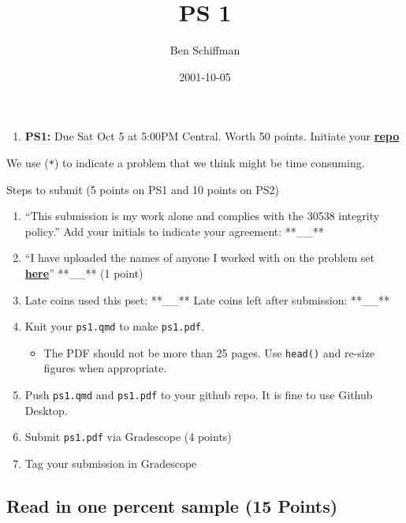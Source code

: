 \documentclass[
  letterpaper,
  DIV=11,
  numbers=noendperiod]{scrartcl}
\title{PS 1}
\author{Ben Schiffman}
\date{2001-10-05}
\providecommand{\tightlist}{%
  \setlength{\itemsep}{0pt}\setlength{\parskip}{0pt}}\usepackage{longtable,booktabs,array}
\begin{document}
\maketitle


\begin{enumerate}
\def\labelenumi{\arabic{enumi}.}
\tightlist
\item
  \textbf{PS1:} Due Sat Oct 5 at 5:00PM Central. Worth 50 points.
  Initiate your
  \textbf{\href{https://classroom.github.com/a/uhUVze3Y}{repo}}
\end{enumerate}

We use (\texttt{*}) to indicate a problem that we think might be time
consuming.

Steps to submit (5 points on PS1 and 10 points on PS2)

\begin{enumerate}
\def\labelenumi{\arabic{enumi}.}
\tightlist
\item
  ``This submission is my work alone and complies with the 30538
  integrity policy.'' Add your initials to indicate your agreement:
  **\_\_**
\item
  ``I have uploaded the names of anyone I worked with on the problem set
  \textbf{\href{https://docs.google.com/forms/d/1-zzHx762odGlpVWtgdIC55vqF-j3gqdAp6Pno1rIGK0/edit}{here}}''
  **\_\_** (1 point)
\item
  Late coins used this pset: **\_\_** Late coins left after submission:
  **\_\_**
\item
  Knit your \texttt{ps1.qmd} to make \texttt{ps1.pdf}.

  \begin{itemize}
  \tightlist
  \item
    The PDF should not be more than 25 pages. Use \texttt{head()} and
    re-size figures when appropriate.
  \end{itemize}
\item
  Push \texttt{ps1.qmd} and \texttt{ps1.pdf} to your github repo. It is
  fine to use Github Desktop.
\item
  Submit \texttt{ps1.pdf} via Gradescope (4 points)
\item
  Tag your submission in Gradescope
\end{enumerate}

\subsection{Read in one percent sample (15
Points)}\label{read-in-one-percent-sample-15-points}
\end{document}
